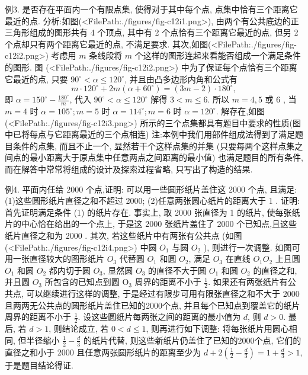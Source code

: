 例3. 是否存在平面内一个有限点集, 使得对于其中每个点, 点集中恰有三个距离它最近的点.
分析:如图(<FilePath:./figures/fig-c12i1.png>), 由两个有公共底边的正三角形组成的图形共有 4 个顶点, 其中有 2 个点恰有三个距离它最近的点, 但另 2 个点却只有两个距离它最近的点, 不满足要求.
其次,如图(<FilePath:./figures/fig-c12i2.png>) 考虑用 $m$ 条线段将 $m$ 个这样的图形连起来看能否组成一个满足条件的图形.
图 (<FilePath:./figures/fig-c12i2.png>) 中为了保证每个点恰有三个距离它最近的点, 只要 $90^{\circ}<\alpha \leqslant 120^{\circ}$, 并且由凸多边形内角和公式有
$$
m \cdot 120^{\circ}+2 m\left(\alpha+60^{\circ}\right)=(3 m-2) \cdot 180^{\circ},
$$
即 $\alpha=150^{\circ}-\frac{180^{\circ}}{m}$, 代入 $90^{\circ}<\alpha \leqslant 120^{\circ}$ 解得 $3<m \leqslant 6$. 所以 $m=4,5$ 或 6 , 当 $m=4$ 时 $\alpha=105^{\circ} ; m=5$ 时 $\alpha=114^{\circ} ; m=6$ 时 $\alpha=120^{\circ}$.
解存在,如图(<FilePath:./figures/fig-c12i3.png>) 所示的三个点集都具有题目中要求的性质(图中已将每点与它距离最近的三个点相连)
注:本例中我们用部件组成法得到了满足题目条件的点集, 而且不止一个, 显然若干个这样点集的并集 (只要每两个这样点集之间点的最小距离大于原点集中任意两点之间距离的最小值) 也满足题目的所有条件, 而在解答中常常将组成的设计及探索过程省略, 只写出了构造的结果.



例4. 平面内任给 2000 个点,证明: 可以用一些圆形纸片盖住这 2000 个点, 且满足:
(1)这些圆形纸片直径之和不超过 2000;
(2)任意两张圆心纸片的距离大于 1 .
证明:首先证明满足条件 (1) 的纸片存在.
事实上, 取 2000 张直径为 1 的纸片, 使每张纸片的中心恰在给出的一个点上, 于是这 2000 张纸片盖住了 2000 个已知点,且这些纸片直径之和为 2000 .
其次, 若这些纸片中有两张有公共点 (如图(<FilePath:./figures/fig-c12i4.png>) 中圆 $O_1$ 与圆 $O_2$ ), 则进行一次调整.
如图可用一张直径较大的图形纸片 $O_3$ 代替圆 $O_1$ 和圆 $O_2$, 满足 $O_3$ 在直线 $O_1 O_2$ 上且圆 $O_1$ 和圆 $O_2$ 都内切于圆 $O_3$, 显然圆 $O_3$ 的直径不大于圆 $O_1$ 和圆 $O_2$ 的直径之和, 并且圆 $O_3$ 所包含的已知点到圆 $\mathrm{O}_3$ 周界的距离不小于 $\frac{1}{2}$. 如果还有两张纸片有公共点, 可以继续进行这样的调整, 于是经过有限步可用有限张直径之和不大于 2000 且两两无公共点的圆形纸片盖住已知的2000个点, 并且每个已知点到覆盖它的纸片周界的距离不小于 $\frac{1}{2}$. 设这些圆纸片每两张之间的距离的最小值为 $d$, 则 $d>0$.
最后, 若 $d>1$, 则结论成立, 若 $0<d \leqslant 1$, 则再进行如下调整: 将每张纸片用圆心相同, 但半径缩小 $\frac{1}{2}-\frac{d}{3}$ 的纸片代替, 则这些新纸片仍盖住了已知的2000个点, 它们的直径之和小于 2000 且任意两张圆形纸片的距离至少为
$d+2\left(\frac{1}{2}-\frac{d}{3}\right)=1+\frac{d}{3}>1$, 于是题目结论得证.



